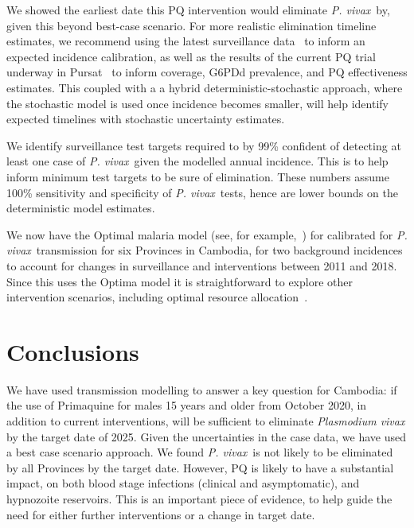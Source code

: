 \documentclass[doublespacing]{bmcart}
\newcommand{\pv}{\textit{P. vivax}}
\begin{document}
We showed the earliest date this PQ intervention would eliminate \pv~by, given this beyond best-case scenario. For more realistic elimination timeline estimates, we recommend using the latest surveillance data~\cite{pengby_mobile} to inform an expected incidence calibration, as well as the results of the current PQ trial underway in Pursat~\cite{CNM_trial} to inform coverage, G6PDd prevalence, and PQ effectiveness estimates. This coupled with a a hybrid deterministic-stochastic approach, where the stochastic model is used once incidence becomes smaller, will help identify expected timelines with stochastic uncertainty estimates. 


We identify surveillance test targets required to by 99\% confident of detecting at least one case of \pv~given the modelled annual incidence. This is to help inform minimum test targets to be sure of elimination. These numbers assume 100\% sensitivity and specificity of \pv~tests, hence are lower bounds on the deterministic model estimates.

We now have the Optimal malaria model (see, for example,~\cite{scott}) for calibrated for \pv~transmission for six Provinces in Cambodia, for two background incidences to account for changes in surveillance and interventions between 2011 and 2018. Since this uses the Optima model it is straightforward to explore other intervention scenarios, including optimal resource allocation~\cite{optima}.

\section*{Conclusions}

We have used transmission modelling to answer a key question for Cambodia: if the use of Primaquine for males 15 years and older from October 2020, in addition to current interventions, will be sufficient to eliminate \textit{Plasmodium vivax} by the target date of 2025. Given the uncertainties in the case data, we have used a best case scenario approach. We found \pv~is not likely to be eliminated by all Provinces by the target date. However, PQ is likely to have a substantial impact, on both blood stage infections (clinical and asymptomatic), and hypnozoite reservoirs. This is an important piece of evidence, to help guide the need for either further interventions or a change in target date. 
\end{document}
